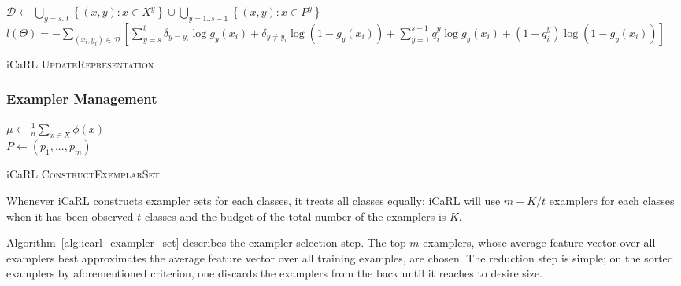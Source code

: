 \begin{algorithm}[ht]

  $\mathcal{D} \leftarrow \bigcup\limits_{y=s..t}\left\{ (x,y) : x \in X^y \right\} \cup \bigcup\limits_{y=1..s-1}\left\{ (x,y) : x \in P^y \right\} $  \\
$l(\Theta) = - \sum\limits_{\left(x_i,y_i\right) \in \mathcal{D}} \left[ \sum\limits_{y=s}^t \delta_{y=y_i}\log g_y(x_i) + \delta_{y\neq y_i}\log \left(1-g_y(x_i)\right) + \sum\limits_{y=1}^{s-1} q_{i}^y\log g_y(x_i) + (1-q_i^y)\log \left(1-g_y(x_i)\right) \right]$ 

\caption{ iCaRL \textsc{UpdateRepresentation} \label{alg:icarl_update}}
\end{algorithm}

\subsubsection{Exampler Management}
\label{sec:icarl_exampler}

\begin{algorithm}[ht]

  $\mu \leftarrow \frac{1}{n}\sum\limits_{x\in X} \phi(x)$  \\
  $P \leftarrow (p_1, ..., p_m)$

\caption {iCaRL \textsc{ConstructExemplarSet} \label{alg:icarl_exampler_set}}
\end{algorithm}

Whenever iCaRL constructs exampler sets for each classes, it treats all classes equally; iCaRL will use $m - K/t$ examplers for each classes when it has been observed $t$ classes and the budget of the total number of the examplers is $K$.

Algorithm~\ref{alg:icarl_exampler_set} describes the exampler selection step. The top $m$ examplers, whose average feature vector over all examplers best approximates the average feature vector over all training examples, are chosen. The reduction step is simple; on the sorted examplers by aforementioned criterion, one discards the examplers from the back until it reaches to desire size.

